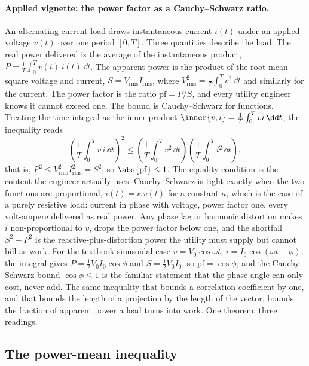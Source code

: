\paragraph{Applied vignette: the power factor as a Cauchy--Schwarz
ratio.} An alternating-current load draws instantaneous current $i(t)$
under an applied voltage $v(t)$ over one period $[0, T]$. Three
quantities describe the load. The real power delivered is the average of
the instantaneous product, $P = \frac{1}{T}\int_{0}^{T} v(t)\, i(t)\,
\dd t$. The apparent power is the product of the root-mean-square voltage
and current, $S = V_{\mathrm{rms}} I_{\mathrm{rms}}$, where
$V_{\mathrm{rms}}^{2} = \frac{1}{T}\int_{0}^{T} v^{2}\,\dd t$ and
similarly for the current. The power factor is the ratio $\mathrm{pf} =
P/S$, and every utility engineer knows it cannot exceed one. The bound
is Cauchy--Schwarz for functions. Treating the time integral as the
inner product $\inner{v, i} = \frac{1}{T}\int_{0}^{T} v i\, \dd t$, the
inequality reads
\[
\left(\frac{1}{T}\int_{0}^{T} v\, i\, \dd t\right)^{2}
\leq
\left(\frac{1}{T}\int_{0}^{T} v^{2}\, \dd t\right)
\left(\frac{1}{T}\int_{0}^{T} i^{2}\, \dd t\right),
\]
that is, $P^{2} \leq V_{\mathrm{rms}}^{2} I_{\mathrm{rms}}^{2} = S^{2}$,
so $\abs{\mathrm{pf}} \leq 1$. The equality condition is the content the
engineer actually uses. Cauchy--Schwarz is tight exactly when the two
functions are proportional, $i(t) = \kappa\, v(t)$ for a constant
$\kappa$, which is the case of a purely resistive load: current in phase
with voltage, power factor one, every volt-ampere delivered as real
power. Any phase lag or harmonic distortion makes $i$ non-proportional to
$v$, drops the power factor below one, and the shortfall $S^{2} - P^{2}$
is the reactive-plus-distortion power the utility must supply but cannot
bill as work. For the textbook sinusoidal case $v = V_{0}\cos\omega t$,
$i = I_{0}\cos(\omega t - \phi)$, the integral gives $P = \tfrac12 V_{0}
I_{0}\cos\phi$ and $S = \tfrac12 V_{0} I_{0}$, so $\mathrm{pf} =
\cos\phi$, and the Cauchy--Schwarz bound $\cos\phi \leq 1$ is the
familiar statement that the phase angle can only cost, never add. The
same inequality that bounds a correlation coefficient by one, and that
bounds the length of a projection by the length of the vector, bounds
the fraction of apparent power a load turns into work. One theorem, three
readings.

\subsection{The power-mean inequality}

